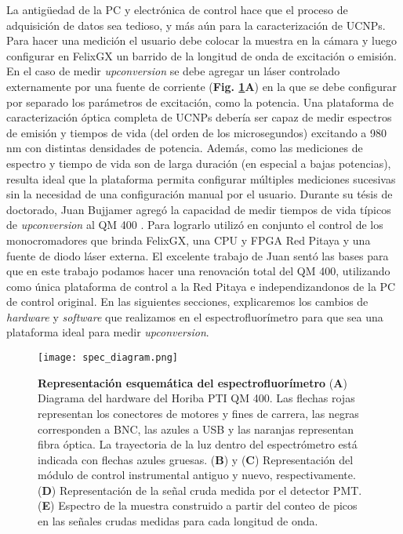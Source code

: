 La antigüedad de la PC y electrónica de control hace que el proceso de adquisición de datos sea tedioso, y más aún para la caracterización de UCNPs.
Para hacer una medición el usuario debe colocar la muestra en la cámara y luego configurar en FelixGX un barrido de la longitud de onda de excitación o emisión.
En el caso de medir \textit{upconversion} se debe agregar un láser controlado externamente por una fuente de corriente (\textbf{Fig. \ref{fig:ref-diagram}A}) en la que se debe configurar por separado los parámetros de excitación, como la potencia.
Una plataforma de caracterización óptica completa de UCNPs debería ser capaz de medir espectros de emisión y tiempos de vida (del orden de los microsegundos) excitando a 980 nm con distintas densidades de potencia.
Además, como las mediciones de espectro y tiempo de vida son de larga duración (en especial a bajas potencias), resulta ideal que la plataforma permita configurar múltiples mediciones sucesivas sin la necesidad de una configuración manual por el usuario.
Durante su tésis de doctorado, Juan Bujjamer agregó la capacidad de medir tiempos de vida típicos de \textit{upconversion} al QM 400 \cite{bujjamer2020}. 
Para lograrlo utilizó en conjunto el control de los monocromadores que brinda FelixGX, una CPU y FPGA Red Pitaya y una fuente de diodo láser externa.
El excelente trabajo de Juan sentó las bases para que en este trabajo podamos hacer una renovación total del QM 400, utilizando como única plataforma de control a la Red Pitaya e independizandonos de la PC de control original.
En las siguientes secciones, explicaremos los cambios de \textit{hardware} y \textit{software} que realizamos en el espectrofluorímetro para que sea una plataforma ideal para medir \textit{upconversion}.



\begin{figure}[btp]
     \centering
     \texttt{[image: spec\_diagram.png]}
     \caption{
     \textbf{Representación esquemática del espectrofluorímetro}
     (\textbf{A}) Diagrama del hardware del Horiba PTI QM 400. Las flechas rojas representan los conectores de motores y fines de carrera, las negras corresponden a BNC, las azules a USB y las naranjas representan fibra óptica. La trayectoria de la luz dentro del espectrómetro está indicada con flechas azules gruesas.
     (\textbf{B}) y (\textbf{C}) Representación del módulo de control instrumental antiguo y nuevo, respectivamente.
     (\textbf{D}) Representación de la señal cruda medida por el detector PMT.
     (\textbf{E}) Espectro de la muestra construido a partir del conteo de picos en las señales crudas medidas para cada longitud de onda.
    }
     \label{fig:ref-diagram}
\end{figure}

